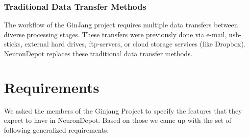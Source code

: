 \documentclass{frontiersSCNS} %
\begin{document}
\subsubsection{Traditional Data Transfer Methods}

The workflow of the GinJang project requires multiple data transfers between
diverse processing stages. These transfers were previously done via e-mail,
usb-sticks, external hard drives, ftp-servers, or cloud storage services (like
Dropbox). NeuronDepot replaces these traditional data transfer methods.



\section{Requirements}
We asked the members of the Ginjang Project to specify the features that they
expect to have in  NeuronDepot. Based on those we came up with the set of
following generalized requirements:
\end{document}
